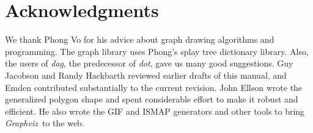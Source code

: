 \documentclass[11pt]{article}
\def\dot{{\it dot}}
\def\dag{{\it dag}}
\def\graphviz{{\it Graphviz}}
\begin{document}
{\section{Acknowledgments}
We thank Phong Vo for his advice
about graph drawing algorithms and programming.
The graph library uses Phong's splay tree dictionary library.
Also, the users of \dag, the predecessor of \dot, 
gave us many good suggestions.
Guy Jacobson and Randy Hackbarth reviewed earlier
drafts of this manual, and Emden contributed substantially to the
current revision.  John Ellson wrote the generalized polygon
shape and spent considerable effort to make it robust and efficient.
He also wrote the GIF and ISMAP generators and other tools
to bring \graphviz\ to the web.

\clearpage
 

\appendix
\clearpage
}
\end{document}
